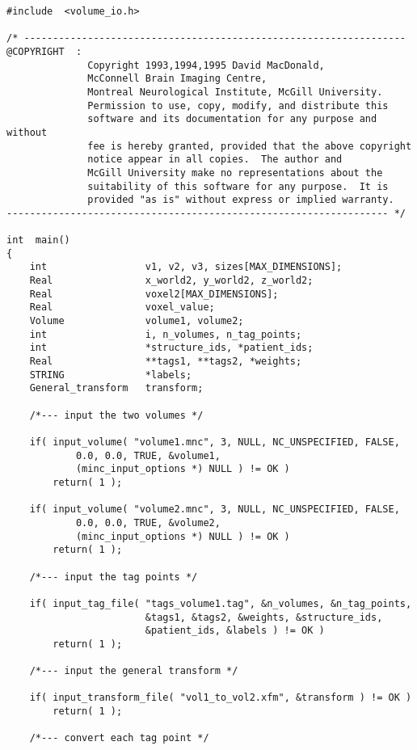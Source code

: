 {\small
\begin{verbatim}
#include  <volume_io.h>

/* ------------------------------------------------------------------
@COPYRIGHT  :
              Copyright 1993,1994,1995 David MacDonald,
              McConnell Brain Imaging Centre,
              Montreal Neurological Institute, McGill University.
              Permission to use, copy, modify, and distribute this
              software and its documentation for any purpose and without
              fee is hereby granted, provided that the above copyright
              notice appear in all copies.  The author and
              McGill University make no representations about the
              suitability of this software for any purpose.  It is
              provided "as is" without express or implied warranty.
------------------------------------------------------------------ */

int  main()
{
    int                 v1, v2, v3, sizes[MAX_DIMENSIONS];
    Real                x_world2, y_world2, z_world2;
    Real                voxel2[MAX_DIMENSIONS];
    Real                voxel_value;
    Volume              volume1, volume2;
    int                 i, n_volumes, n_tag_points;
    int                 *structure_ids, *patient_ids;
    Real                **tags1, **tags2, *weights;
    STRING              *labels;
    General_transform   transform;

    /*--- input the two volumes */

    if( input_volume( "volume1.mnc", 3, NULL, NC_UNSPECIFIED, FALSE,
            0.0, 0.0, TRUE, &volume1,
            (minc_input_options *) NULL ) != OK )
        return( 1 );

    if( input_volume( "volume2.mnc", 3, NULL, NC_UNSPECIFIED, FALSE,
            0.0, 0.0, TRUE, &volume2,
            (minc_input_options *) NULL ) != OK )
        return( 1 );

    /*--- input the tag points */

    if( input_tag_file( "tags_volume1.tag", &n_volumes, &n_tag_points,
                        &tags1, &tags2, &weights, &structure_ids,
                        &patient_ids, &labels ) != OK )
        return( 1 );

    /*--- input the general transform */

    if( input_transform_file( "vol1_to_vol2.xfm", &transform ) != OK )
        return( 1 );

    /*--- convert each tag point */


\end{verbatim}}
